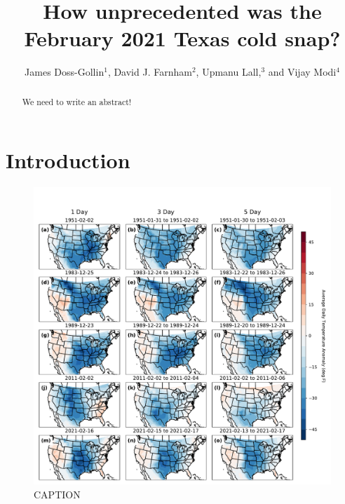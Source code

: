 \documentclass[12pt]{iopart}
\begin{document}
\title[PREPRINT by Doss-Gollin, Farnham, Lall, and Modi]{How unprecedented was the February 2021 Texas cold snap?}

\author{James Doss-Gollin$^1$, David J. Farnham$^2$, Upmanu Lall,$^3$ and Vijay Modi$^4$}
\address{$^1$ Department of Civil and Environmental Engineering, Rice University, Houston, TX}
\address{$^2$ Demo}
\address{$^3$ Demo}
\address{$^4$ Demo}
\vspace{10pt}

\begin{abstract}
  We need to write an abstract!
\end{abstract}

\maketitle
\nocite{*}

\section{Introduction}

\begin{figure}
  \centering
  \includegraphics[width=\textwidth]{historic_events_era5.pdf}
  \caption{CAPTION}\label{fig:historic_era5}
\end{figure}
\end{document}
